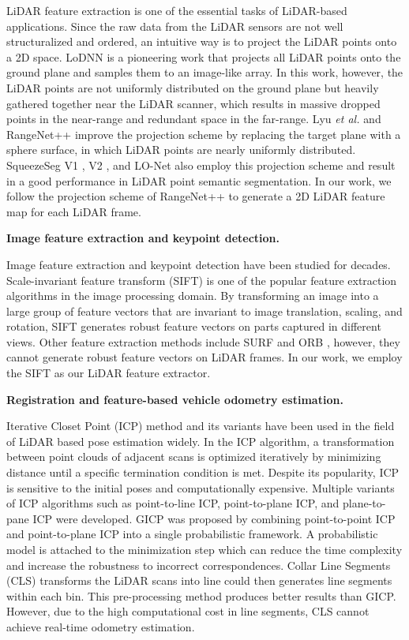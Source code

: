 \documentclass[sigconf]{acmart}
\def\etal{\emph{et al. }}
\newcommand{\bfsection}[1]{\vspace*{0.1cm}\noindent\textbf{#1.}}
\begin{document}
LiDAR feature extraction is one of the essential tasks of LiDAR-based applications. Since the raw data from the LiDAR sensors are not well structuralized and ordered, an intuitive way is to project the LiDAR points onto a 2D space. LoDNN \cite{caltagirone2017Lodnn} is a pioneering work that projects all LiDAR points onto the ground plane and samples them to an image-like array. In this work, however, the LiDAR points are not uniformly distributed on the ground plane but heavily gathered together near the LiDAR scanner, which results in massive dropped points in the near-range and redundant space in the far-range. Lyu \etal{} \cite{lyu2018real,lyu2018chipnet} and RangeNet++ \cite{milioto2019rangenet++} improve the projection scheme by replacing the target plane with a sphere surface, in which LiDAR points are nearly uniformly distributed. SqueezeSeg V1 \cite{wu2018squeezeseg}, V2 \cite{wu2019squeezesegv2}, and LO-Net \cite{LO-Net} also employ this projection scheme and result in a good performance in LiDAR point semantic segmentation. In our work, we follow the projection scheme of RangeNet++ to generate a 2D LiDAR feature map for each LiDAR frame.

\bfsection{Image feature extraction and keypoint detection}

Image feature extraction and keypoint detection have been studied for decades. Scale-invariant feature transform (SIFT) \cite{lowe1999sift} is one of the popular feature extraction algorithms in the image processing domain. By transforming an image into a large group of feature vectors that are invariant to image translation, scaling, and rotation, SIFT generates robust feature vectors on parts captured in different views. Other feature extraction methods include SURF \cite{bay2006surf} and ORB \cite{rublee2011orb}, however, they cannot generate robust feature vectors on LiDAR frames. In our work, we employ the SIFT as our LiDAR feature extractor.

\bfsection{Registration and feature-based vehicle odometry estimation}

Iterative Closet Point (ICP)\cite{ICP} method and its variants\cite{ICP_variants}\cite{ICP_variants1}\cite{ICP_variants2} have been used in the field of LiDAR based pose estimation widely. In the ICP algorithm, a transformation between point clouds of adjacent scans is optimized iteratively by minimizing distance until a specific termination condition is met. Despite its popularity, ICP is sensitive to the initial poses and computationally expensive. Multiple variants of ICP algorithms such as point-to-line ICP\cite{ICP_l}, point-to-plane ICP\cite{ICP_p2plane}, and plane-to-pane ICP\cite{ICP_variants} were developed. GICP\cite{GICP} was proposed by combining point-to-point ICP and point-to-plane ICP into a single probabilistic framework. A probabilistic model is attached to the minimization step which can reduce the time complexity and increase the robustness to incorrect correspondences. Collar Line Segments (CLS)\cite{CLS} transforms the LiDAR scans into line could then generates line segments within each bin. This pre-processing method produces better results than GICP. However, due to the high computational cost in line segments, CLS cannot achieve real-time odometry estimation. 
\end{document}
